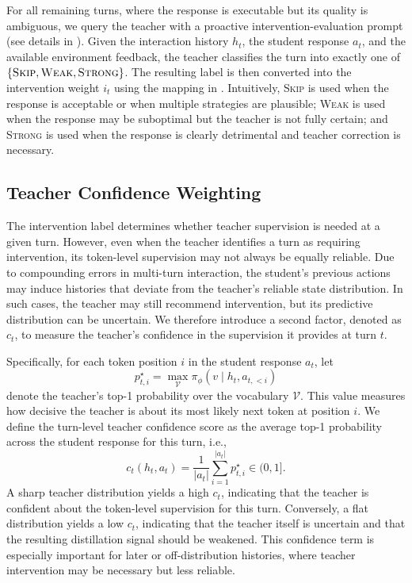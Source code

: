 For all remaining turns, where the response is executable but its quality is ambiguous, we query the teacher with a proactive intervention-evaluation prompt (see details in ). 
%
Given the interaction history $h_t$, the student response $a_t$, and the available environment feedback, the teacher classifies the turn into exactly one of $\{\textsc{Skip}, \textsc{Weak}, \textsc{Strong}\}$. 
%
The resulting label is then converted into the intervention weight $i_t$ using the mapping in . 
%
Intuitively, \textsc{Skip} is used when the response is acceptable or when multiple strategies are plausible; \textsc{Weak} is used when the response may be suboptimal but the teacher is not fully certain; and \textsc{Strong} is used when the response is clearly detrimental and teacher correction is necessary. 
%


\subsection{Teacher Confidence Weighting}
The intervention label determines whether teacher supervision is needed at a given turn. 
%
However, even when the teacher identifies a turn as requiring intervention, its token-level supervision may not always be equally reliable. 
%
Due to compounding errors in multi-turn interaction, the student's previous actions may induce histories that deviate from the teacher's reliable state distribution.
%
In such cases, the teacher may still recommend intervention, but its predictive distribution can be uncertain. 
%
We therefore introduce a second factor, denoted as $c_t$, to measure the teacher's confidence in the supervision it provides at turn $t$.
%

Specifically, for each token position $i$ in the student response $a_t$, let
\begin{equation}
    p^{\star}_{t,i}
    =
    \max_{\mathcal{V}}
    \pi_{\phi}(v \mid h_t, a_{t,<i})
\end{equation}
denote the teacher's top-1 probability over the vocabulary $\mathcal{V}$.
%
This value measures how decisive the teacher is about its most likely next token at position $i$. 
%
We define the turn-level teacher confidence score as the average top-1 probability across the student response for this turn, i.e.,
\begin{equation}
    c_t(h_t,a_t)
    =
    \frac{1}{|a_t|}
    \sum_{i=1}^{|a_t|}
    p^{\star}_{t,i}
    \in (0,1].
\end{equation}
%
A sharp teacher distribution yields a high $c_t$, indicating that the teacher is confident about the token-level supervision for this turn. 
%
Conversely, a flat distribution yields a low $c_t$, indicating that the teacher itself is uncertain and that the resulting distillation signal should be weakened. 
%
This confidence term is especially important for later or off-distribution histories, where teacher intervention may be necessary but less reliable.
%

